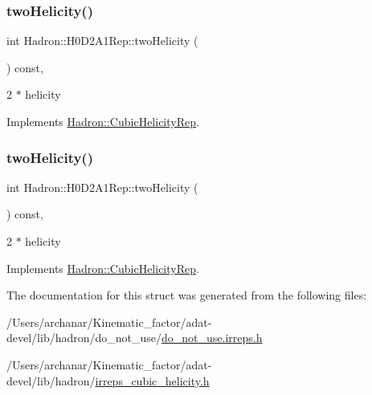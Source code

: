 \subsubsection{\texorpdfstring{twoHelicity()}{twoHelicity()}\hspace{0.1cm}{\footnotesize\ttfamily [2/3]}}
{\footnotesize\ttfamily int Hadron\+::\+H0\+D2\+A1\+Rep\+::two\+Helicity (\begin{DoxyParamCaption}{ }\end{DoxyParamCaption}) const\hspace{0.3cm}{\ttfamily [inline]}, {\ttfamily [virtual]}}

2 $\ast$ helicity 

Implements \mbox{\hyperlink{structHadron_1_1CubicHelicityRep_af507aa56fc2747eacc8cb6c96db31ecc}{Hadron\+::\+Cubic\+Helicity\+Rep}}.

\mbox{\label{structHadron_1_1H0D2A1Rep_a222dee2dd348d1c79d09ae173d2c2b6f}} 
\subsubsection{\texorpdfstring{twoHelicity()}{twoHelicity()}\hspace{0.1cm}{\footnotesize\ttfamily [3/3]}}
{\footnotesize\ttfamily int Hadron\+::\+H0\+D2\+A1\+Rep\+::two\+Helicity (\begin{DoxyParamCaption}{ }\end{DoxyParamCaption}) const\hspace{0.3cm}{\ttfamily [inline]}, {\ttfamily [virtual]}}

2 $\ast$ helicity 

Implements \mbox{\hyperlink{structHadron_1_1CubicHelicityRep_af507aa56fc2747eacc8cb6c96db31ecc}{Hadron\+::\+Cubic\+Helicity\+Rep}}.



The documentation for this struct was generated from the following files\+:\begin{DoxyCompactItemize}
\item 
/\+Users/archanar/\+Kinematic\+\_\+factor/adat-\/devel/lib/hadron/do\+\_\+not\+\_\+use/\mbox{\hyperlink{adat-devel_2lib_2hadron_2do__not__use_2do__not__use_8irreps_8h}{do\+\_\+not\+\_\+use.\+irreps.\+h}}\item 
/\+Users/archanar/\+Kinematic\+\_\+factor/adat-\/devel/lib/hadron/\mbox{\hyperlink{adat-devel_2lib_2hadron_2irreps__cubic__helicity_8h}{irreps\+\_\+cubic\+\_\+helicity.\+h}}\end{DoxyCompactItemize}
